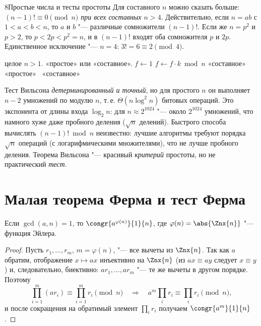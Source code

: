 \begin{lecture}{8}{Простые числа и тесты простоты}
Для составного $n$ можно сказать больше: \emph{$(n - 1)! \equiv 0 \pmod n$ при всех составных
$n > 4$}. Действительно, если $n = ab$ с $1 < a < b < n$, то $a$ и $b$ "--- различные
сомножители $(n - 1)!$. Если же $n = p^2$ и $p > 2$, то $p < 2p < p^2 = n$, и в $(n - 1)!$
входят оба сомножителя $p$ и $2p$. Единственное исключение "--- $n = 4$: $3! = 6 \equiv 2 \pmod 4$.

\begin{algorithm}
\begin{algorithmic}[1]
\Require целое $n > 1$.
\Ensure «простое» или «составное».
\State $f \gets 1$
  \State $f \gets f \cdot k \bmod n$
   \Return «составное» \EndIf
\EndFor
{} \Return «простое» \Else\ \Return «составное» \EndIf
\end{algorithmic}
\end{algorithm}


Тест Вильсона \emph{детерминированный и точный}, но для простого $n$ он выполняет $n - 2$
умножений по модулю $n$, т.\,е. $\Theta(n \log^2 n)$ битовых операций. Это экспонента от
длины входа $\log_2 n$: для $n \approx 2^{1024}$ "--- около $2^{1024}$ умножений, что намного
хуже даже пробного деления ($\sqrt n$ делений). Быстрого способа вычислять $(n - 1)! \bmod n$
неизвестно: лучшие алгоритмы требуют порядка $\sqrt n$ операций (с логарифмическими
множителями), что не лучше пробного деления. Теорема Вильсона "--- красивый
\emph{критерий} простоты, но не практический \emph{тест}.


\section{Малая теорема Ферма и тест Ферма}

\begin{theorem}[Эйлер]\label{l8:euler}
Если $\gcd(a, n) = 1$, то $\congr{a^{\varphi(n)}}{1}{n}$, где $\varphi(n) = \abs{\Znx{n}}$ "---
функция Эйлера.
\end{theorem}

\begin{proof}
Пусть $r_1, \ldots, r_m$, $m = \varphi(n)$, "--- все вычеты из $\Znx{n}$. Так как $a$ обратим,
отображение $x \mapsto ax$ инъективно на $\Znx{n}$ (из $ax \equiv ay$ следует $x \equiv y$)
и, следовательно, биективно: $ar_1, \ldots, ar_m$ "--- те же вычеты в другом порядке. Поэтому
\[
  \prod_{i=1}^{m} (a r_i) \equiv \prod_{i=1}^{m} r_i \pmod n
  \quad\Longrightarrow\quad a^{m} \prod_i r_i \equiv \prod_i r_i \pmod n,
\]
и после сокращения на обратимый элемент $\prod_i r_i$ получаем $\congr{a^m}{1}{n}$.
\end{proof}


\end{lecture}
